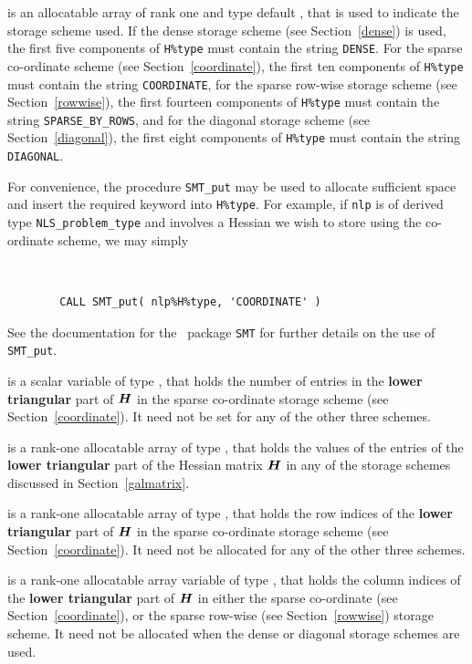 \documentclass{galahad}
\newcommand{\packagename}{NLS}
\begin{document}
\begin{description}
\begin{description}
 is an allocatable array of rank one and type default
\character, that
is used to indicate the storage scheme used. If the dense storage scheme
(see Section~\ref{dense}) is used,
the first five components of {\tt H\%type} must contain the
string {\tt DENSE}.
For the sparse co-ordinate scheme (see Section~\ref{coordinate}),
the first ten components of {\tt H\%type} must contain the
string {\tt COORDINATE},
for the sparse row-wise storage scheme (see Section~\ref{rowwise}),
the first fourteen components of {\tt H\%type} must contain the
string {\tt SPARSE\_BY\_ROWS},
and for the diagonal storage scheme (see Section~\ref{diagonal}),
the first eight components of {\tt H\%type} must contain the
string {\tt DIAGONAL}.

For convenience, the procedure {\tt SMT\_put}
may be used to allocate sufficient space and insert the required keyword
into {\tt H\%type}.
For example, if {\tt nlp} is of derived type {\tt \packagename\_problem\_type}
and involves a Hessian we wish to store using the co-ordinate scheme,
we may simply
{\tt
\begin{verbatim}
        CALL SMT_put( nlp%H%type, 'COORDINATE' )
\end{verbatim}
}
\noindent
See the documentation for the \galahad\ package {\tt SMT}
for further details on the use of {\tt SMT\_put}.

 is a scalar variable of type \integer, that
holds the number of entries in the {\bf lower triangular} part of ${\bm{H}}$
in the sparse co-ordinate storage scheme (see Section~\ref{coordinate}).
It need not be set for any of the other three schemes.

 is a rank-one allocatable array of type \realdp, that holds
the values of the entries of the {\bf lower triangular} part
of the Hessian matrix ${\bm{H}}$ in any of the
storage schemes discussed in Section~\ref{galmatrix}.

 is a rank-one allocatable array of type \integer,
that holds the row indices of the {\bf lower triangular} part of ${\bm{H}}$
in the sparse co-ordinate storage
scheme (see Section~\ref{coordinate}).
It need not be allocated for any of the other three schemes.

 is a rank-one allocatable array variable of type \integer,
that holds the column indices of the {\bf lower triangular} part of
${\bm{H}}$ in either the sparse co-ordinate
(see Section~\ref{coordinate}), or the sparse row-wise
(see Section~\ref{rowwise}) storage scheme.
It need not be allocated when the dense or diagonal storage schemes are used.


\end{description}
\end{description}
\end{document}
